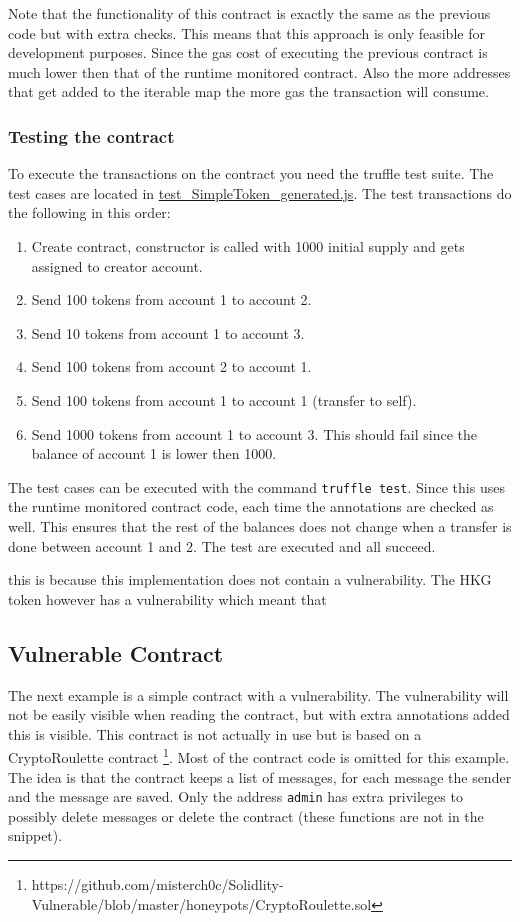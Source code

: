 \documentclass[a4paper]{article}
\begin{document}
Note that the functionality of this contract is exactly the same as the previous code but with extra checks. This means that this approach is only feasible for development purposes. Since the gas cost of executing the previous contract is much lower then that of the runtime monitored contract. Also the more addresses that get added to the iterable map the more gas the transaction will consume.

\subsubsection{Testing the contract}
To execute the transactions on the contract you need the truffle test suite. The test cases are located in \href{https://github.com/LarsStegeman/EthereumRuntimeMonitoring/blob/master/src/test/test_SimpleToken_generated.js}{test\_SimpleToken\_generated.js}.
The test transactions do the following in this order:
\begin{enumerate}
  \item Create contract, constructor is called with 1000 initial supply and gets assigned to creator account.
  \item Send 100 tokens from account 1 to account 2.
  \item Send 10 tokens from account 1 to account 3.
  \item Send 100 tokens from account 2 to account 1.
  \item Send 100 tokens from account 1 to account 1 (transfer to self).
  \item Send 1000 tokens from account 1 to account 3. This should fail since the balance of account 1 is lower then 1000.
\end{enumerate}
The test cases can be executed with the command \texttt{truffle test}. Since this uses the runtime monitored contract code, each time the annotations are checked as well. This ensures that the rest of the balances does not change when a transfer is done between account 1 and 2. The test are executed and all succeed. \par
 this is because this implementation does not contain a vulnerability. The HKG token however has a vulnerability which meant that 

\subsection{Vulnerable Contract}
The next example is a simple contract with a vulnerability. The vulnerability will not be easily visible when reading the contract, but with extra annotations added this is visible. This contract is not actually in use but is based on a CryptoRoulette contract \footnote{https://github.com/misterch0c/Solidlity-Vulnerable/blob/master/honeypots/CryptoRoulette.sol}. Most of the contract code is omitted for this example. The idea is that the contract keeps a list of messages, for each message the sender and the message are saved. Only the address \texttt{admin} has extra privileges to possibly delete messages or delete the contract (these functions are not in the snippet).

\end{document}
